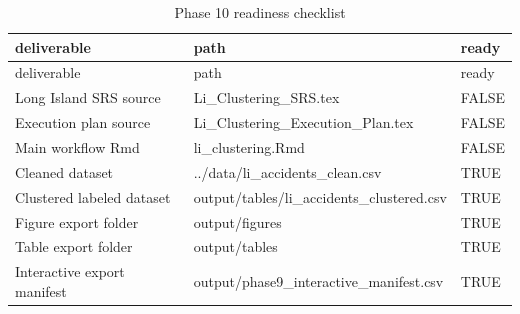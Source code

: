 \documentclass[
]{article}
\begin{document}
\begin{longtable}[]{@{}
  >{\raggedright\arraybackslash}p{}
  >{\raggedright\arraybackslash}p{}
  >{\raggedright\arraybackslash}p{}@{}}
\caption{Phase 10 readiness checklist}\tabularnewline
\toprule\noalign{}
\begin{minipage}[b]{\linewidth}\raggedright
deliverable
\end{minipage} & \begin{minipage}[b]{\linewidth}\raggedright
path
\end{minipage} & \begin{minipage}[b]{\linewidth}\raggedright
ready
\end{minipage} \\
\midrule\noalign{}
\endfirsthead
\toprule\noalign{}
\begin{minipage}[b]{\linewidth}\raggedright
deliverable
\end{minipage} & \begin{minipage}[b]{\linewidth}\raggedright
path
\end{minipage} & \begin{minipage}[b]{\linewidth}\raggedright
ready
\end{minipage} \\
\midrule\noalign{}
\endhead
\bottomrule\noalign{}
\endlastfoot
Long Island SRS source & Li\_Clustering\_SRS.tex & FALSE \\
Execution plan source & Li\_Clustering\_Execution\_Plan.tex & FALSE \\
Main workflow Rmd & li\_clustering.Rmd & FALSE \\
Cleaned dataset & ../data/li\_accidents\_clean.csv & TRUE \\
Clustered labeled dataset & output/tables/li\_accidents\_clustered.csv &
TRUE \\
Figure export folder & output/figures & TRUE \\
Table export folder & output/tables & TRUE \\
Interactive export manifest & output/phase9\_interactive\_manifest.csv &
TRUE \\
\end{longtable}
\end{document}
